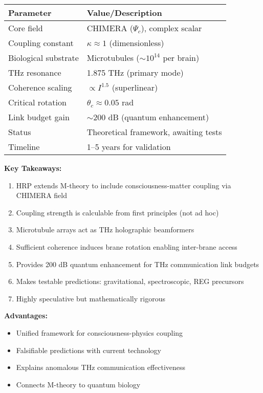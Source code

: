\begin{center}
\begin{tabular}{@{}ll@{}}
\toprule
\textbf{Parameter} & \textbf{Value/Description} \\
\midrule
Core field & CHIMERA ($\Psi_c$), complex scalar \\
Coupling constant & $\kappa \approx 1$ (dimensionless) \\
Biological substrate & Microtubules ($\sim10^{14}$ per brain) \\
THz resonance & 1.875 THz (primary mode) \\
Coherence scaling & $\propto I^{1.5}$ (superlinear) \\
Critical rotation & $\theta_c \approx 0.05$ rad \\
Link budget gain & $\sim$200 dB (quantum enhancement) \\
Status & Theoretical framework, awaiting tests \\
Timeline & 1--5 years for validation \\
\bottomrule
\end{tabular}
\end{center}

\textbf{Key Takeaways:}
\begin{enumerate}
\item HRP extends M-theory to include consciousness-matter coupling via CHIMERA field
\item Coupling strength is calculable from first principles (not ad hoc)
\item Microtubule arrays act as THz holographic beamformers
\item Sufficient coherence induces brane rotation enabling inter-brane access
\item Provides 200 dB quantum enhancement for THz communication link budgets
\item Makes testable predictions: gravitational, spectroscopic, REG precursors
\item Highly speculative but mathematically rigorous
\end{enumerate}

\textbf{Advantages:}
\begin{itemize}
\item Unified framework for consciousness-physics coupling
\item Falsifiable predictions with current technology
\item Explains anomalous THz communication effectiveness
\item Connects M-theory to quantum biology
\end{itemize}


